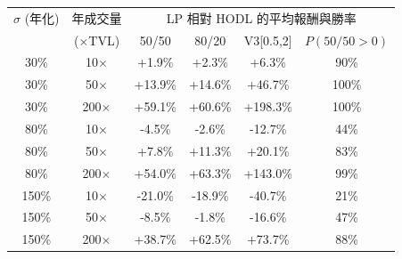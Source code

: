\begin{tabular}{cc|cccc}
\toprule
$\sigma$ (年化) & 年成交量 & \multicolumn{4}{c}{LP 相對 HODL 的平均報酬與勝率} \\
 & ($\times$TVL) & 50/50 & 80/20 & V3[0.5,2] & $P(\text{50/50}{>}0)$ \\
\midrule
30\% & 10$\times$ & +1.9\% & +2.3\% & +6.3\% & 90\% \\
30\% & 50$\times$ & +13.9\% & +14.6\% & +46.7\% & 100\% \\
30\% & 200$\times$ & +59.1\% & +60.6\% & +198.3\% & 100\% \\
80\% & 10$\times$ & -4.5\% & -2.6\% & -12.7\% & 44\% \\
80\% & 50$\times$ & +7.8\% & +11.3\% & +20.1\% & 83\% \\
80\% & 200$\times$ & +54.0\% & +63.3\% & +143.0\% & 99\% \\
150\% & 10$\times$ & -21.0\% & -18.9\% & -40.7\% & 21\% \\
150\% & 50$\times$ & -8.5\% & -1.8\% & -16.6\% & 47\% \\
150\% & 200$\times$ & +38.7\% & +62.5\% & +73.7\% & 88\% \\
\bottomrule
\end{tabular}
